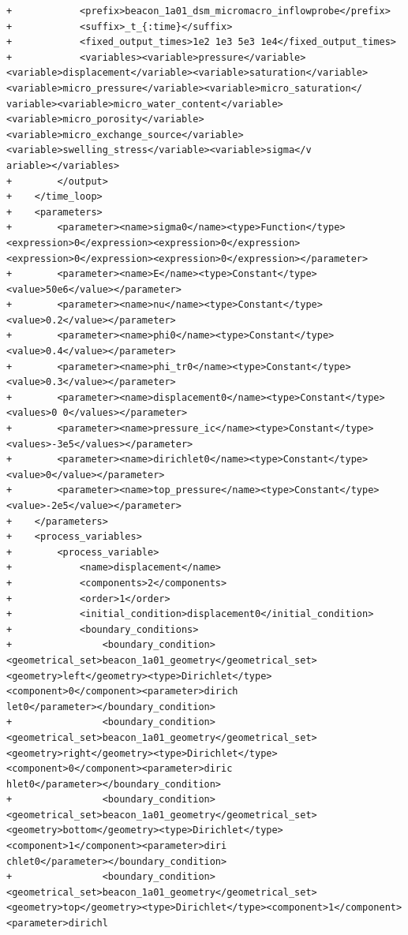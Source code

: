 \documentclass[10pt]{article}
\begin{document}
\begin{lstlisting}
+            <prefix>beacon_1a01_dsm_micromacro_inflowprobe</prefix>
+            <suffix>_t_{:time}</suffix>
+            <fixed_output_times>1e2 1e3 5e3 1e4</fixed_output_times>
+            <variables><variable>pressure</variable><variable>displacement</variable><variable>saturation</variable><variable>micro_pressure</variable><variable>micro_saturation</
variable><variable>micro_water_content</variable><variable>micro_porosity</variable><variable>micro_exchange_source</variable><variable>swelling_stress</variable><variable>sigma</v
ariable></variables>
+        </output>
+    </time_loop>
+    <parameters>
+        <parameter><name>sigma0</name><type>Function</type><expression>0</expression><expression>0</expression><expression>0</expression><expression>0</expression></parameter>
+        <parameter><name>E</name><type>Constant</type><value>50e6</value></parameter>
+        <parameter><name>nu</name><type>Constant</type><value>0.2</value></parameter>
+        <parameter><name>phi0</name><type>Constant</type><value>0.4</value></parameter>
+        <parameter><name>phi_tr0</name><type>Constant</type><value>0.3</value></parameter>
+        <parameter><name>displacement0</name><type>Constant</type><values>0 0</values></parameter>
+        <parameter><name>pressure_ic</name><type>Constant</type><values>-3e5</values></parameter>
+        <parameter><name>dirichlet0</name><type>Constant</type><value>0</value></parameter>
+        <parameter><name>top_pressure</name><type>Constant</type><value>-2e5</value></parameter>
+    </parameters>
+    <process_variables>
+        <process_variable>
+            <name>displacement</name>
+            <components>2</components>
+            <order>1</order>
+            <initial_condition>displacement0</initial_condition>
+            <boundary_conditions>
+                <boundary_condition><geometrical_set>beacon_1a01_geometry</geometrical_set><geometry>left</geometry><type>Dirichlet</type><component>0</component><parameter>dirich
let0</parameter></boundary_condition>
+                <boundary_condition><geometrical_set>beacon_1a01_geometry</geometrical_set><geometry>right</geometry><type>Dirichlet</type><component>0</component><parameter>diric
hlet0</parameter></boundary_condition>
+                <boundary_condition><geometrical_set>beacon_1a01_geometry</geometrical_set><geometry>bottom</geometry><type>Dirichlet</type><component>1</component><parameter>diri
chlet0</parameter></boundary_condition>
+                <boundary_condition><geometrical_set>beacon_1a01_geometry</geometrical_set><geometry>top</geometry><type>Dirichlet</type><component>1</component><parameter>dirichl

\end{lstlisting}
\end{document}
